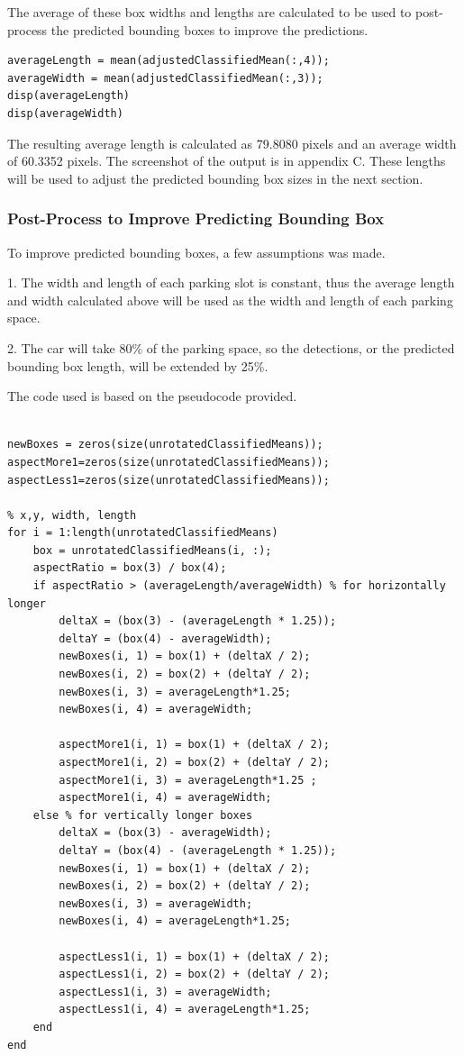 \documentclass[man]{apa7}
\begin{document}
The average of these box widths and lengths are calculated to be used to post-process the predicted bounding boxes to improve the predictions.

\begin{lstlisting}[]
averageLength = mean(adjustedClassifiedMean(:,4));
averageWidth = mean(adjustedClassifiedMean(:,3));
disp(averageLength)
disp(averageWidth)
\end{lstlisting}

The resulting average length is calculated as 79.8080 pixels and an average width of 60.3352 pixels. The screenshot of the output is in appendix C. These lengths will be used to adjust the predicted bounding box sizes in the next section. 

\subsubsection{Post-Process to Improve Predicting Bounding Box}

To improve predicted bounding boxes, a few assumptions was made. 

1. The width and length of each parking slot is constant, thus the average length and width calculated above will be used as the width and length of each parking space.

2. The car will take 80\% of the parking space, so the detections, or the predicted bounding box length, will be extended by 25\%.

The code used is based on the pseudocode provided.

\begin{lstlisting}[]

newBoxes = zeros(size(unrotatedClassifiedMeans));
aspectMore1=zeros(size(unrotatedClassifiedMeans));
aspectLess1=zeros(size(unrotatedClassifiedMeans));

% x,y, width, length
for i = 1:length(unrotatedClassifiedMeans)
    box = unrotatedClassifiedMeans(i, :);
    aspectRatio = box(3) / box(4);
    if aspectRatio > (averageLength/averageWidth) % for horizontally longer
        deltaX = (box(3) - (averageLength * 1.25));
        deltaY = (box(4) - averageWidth);
        newBoxes(i, 1) = box(1) + (deltaX / 2);
        newBoxes(i, 2) = box(2) + (deltaY / 2);
        newBoxes(i, 3) = averageLength*1.25;
        newBoxes(i, 4) = averageWidth;

        aspectMore1(i, 1) = box(1) + (deltaX / 2);
        aspectMore1(i, 2) = box(2) + (deltaY / 2);
        aspectMore1(i, 3) = averageLength*1.25 ;
        aspectMore1(i, 4) = averageWidth;
    else % for vertically longer boxes
        deltaX = (box(3) - averageWidth);
        deltaY = (box(4) - (averageLength * 1.25));
        newBoxes(i, 1) = box(1) + (deltaX / 2);
        newBoxes(i, 2) = box(2) + (deltaY / 2);
        newBoxes(i, 3) = averageWidth;
        newBoxes(i, 4) = averageLength*1.25;

        aspectLess1(i, 1) = box(1) + (deltaX / 2);
        aspectLess1(i, 2) = box(2) + (deltaY / 2);
        aspectLess1(i, 3) = averageWidth;
        aspectLess1(i, 4) = averageLength*1.25;
    end
end
\end{lstlisting}
\end{document}
